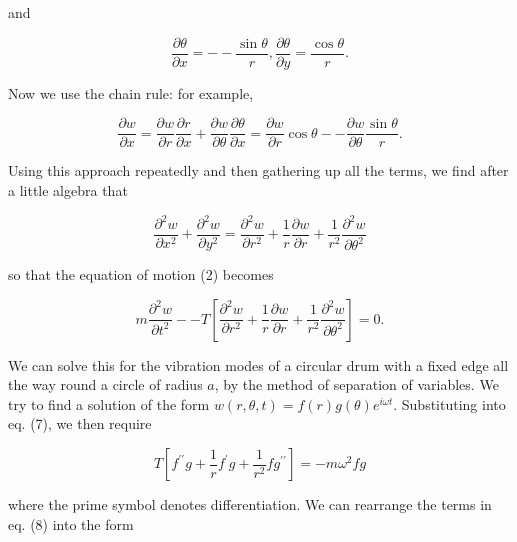   \noindent{}and 

  \begin{equation*}\frac{\partial \theta}{\partial x} = -- \frac{\sin 
  \theta}{r}, \frac{\partial \theta}{\partial y} = \frac{\cos \theta}{r} . 
  \tag{4}\end{equation*} 

  Now we use the chain rule: for example, 

  \begin{equation*}\frac{\partial w}{\partial x} =\frac{\partial w}{\partial r} 
  \frac{\partial r}{\partial x} + \frac{\partial w}{\partial \theta} 
  \frac{\partial \theta}{\partial x}=\frac{\partial w}{\partial r} \cos \theta 
  -- \frac{\partial w}{\partial \theta} \frac{\sin \theta}{r} . 
  \tag{5}\end{equation*} 

  Using this approach repeatedly and then gathering up all the terms, we find 
  after a little algebra that 

  \begin{equation*}\dfrac{\partial^2 w}{\partial x^2} + \dfrac{\partial^2 
  w}{\partial y^2}=\dfrac{\partial^2 w}{\partial r^2} + \dfrac{1}{r} 
  \dfrac{\partial w}{\partial r}+ \dfrac{1}{r^2} \dfrac{\partial^2 w}{\partial 
  \theta^2} \tag{6}\end{equation*} 

  \noindent{}so that the equation of motion (2) becomes 

  \begin{equation*}m \frac{\partial^2 w}{\partial t^2} -- T \left[ 
  \dfrac{\partial^2 w}{\partial r^2} + \dfrac{1}{r} \dfrac{\partial w}{\partial 
  r}+ \dfrac{1}{r^2} \dfrac{\partial^2 w}{\partial \theta^2} \right] =0 . 
  \tag{7}\end{equation*} 

  We can solve this for the vibration modes of a circular drum with a fixed 
  edge all the way round a circle of radius $a$, by the method of separation of 
  variables. We try to find a solution of the form $w(r,\theta,t) = f(r) 
  g(\theta) e^{i \omega t}$. Substituting into eq. (7), we then require 

  \begin{equation*}T \left[ f^{\prime \prime} g +\frac{1}{r} f^{\prime} 
  g+\frac{1}{r^2} f g^{\prime \prime} \right] = -m \omega^2 f g 
  \tag{8}\end{equation*} 

  \noindent{}where the prime symbol denotes differentiation. We can rearrange 
  the terms in eq. (8) into the form 


